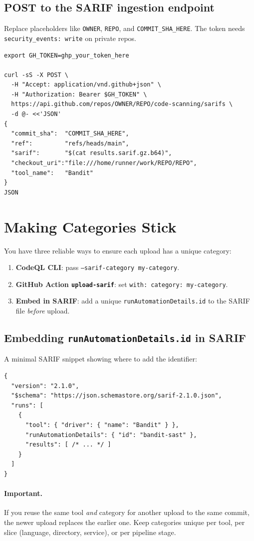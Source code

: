 \documentclass[11pt,a4paper]{article}
\newcommand{\term}[1]{\texttt{#1}}
\begin{document}
\subsection{POST to the SARIF ingestion endpoint}
Replace placeholders like \term{OWNER}, \term{REPO}, and \term{COMMIT\_SHA\_HERE}. The token needs \term{security\_events: write} on private repos.
\begin{verbatim}
export GH_TOKEN=ghp_your_token_here

curl -sS -X POST \
  -H "Accept: application/vnd.github+json" \
  -H "Authorization: Bearer $GH_TOKEN" \
  https://api.github.com/repos/OWNER/REPO/code-scanning/sarifs \
  -d @- <<'JSON'
{
  "commit_sha":  "COMMIT_SHA_HERE",
  "ref":         "refs/heads/main",
  "sarif":       "$(cat results.sarif.gz.b64)",
  "checkout_uri":"file:///home/runner/work/REPO/REPO",
  "tool_name":   "Bandit"
}
JSON
\end{verbatim}

\section{Making Categories Stick}
You have three reliable ways to ensure each upload has a unique category:
\begin{enumerate}
  \item \textbf{CodeQL CLI}: pass \term{--sarif-category my-category}.
  \item \textbf{GitHub Action \term{upload-sarif}}: set \term{with: category: my-category}.
  \item \textbf{Embed in SARIF}: add a unique \term{runAutomationDetails.id} to the SARIF file \emph{before} upload.
\end{enumerate}
\clearpage

\subsection{Embedding \texttt{runAutomationDetails.id} in SARIF}
A minimal SARIF snippet showing where to add the identifier:
\begin{verbatim}
{
  "version": "2.1.0",
  "$schema": "https://json.schemastore.org/sarif-2.1.0.json",
  "runs": [
    {
      "tool": { "driver": { "name": "Bandit" } },
      "runAutomationDetails": { "id": "bandit-sast" },
      "results": [ /* ... */ ]
    }
  ]
}
\end{verbatim}

\paragraph{Important.} If you reuse the same tool \emph{and} category for another upload to the same commit, the newer upload replaces the earlier one. Keep categories unique per tool, per slice (language, directory, service), or per pipeline stage.
\end{document}
